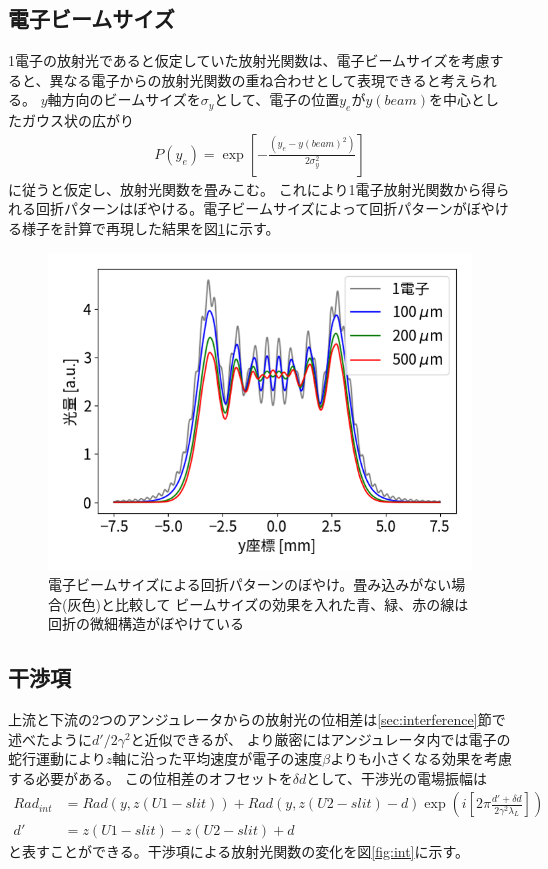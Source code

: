 \documentclass[a4paper,11pt,uplatex]{jsbook}
\begin{document}
\subsection{電子ビームサイズ}
1電子の放射光であると仮定していた放射光関数は、電子ビームサイズを考慮すると、異なる電子からの放射光関数の重ね合わせとして表現できると考えられる。
$y$軸方向のビームサイズを$\sigma_y$として、電子の位置$y_e$が$y(beam)$を中心としたガウス状の広がり
\begin{align}
  P(y_e) = \exp \left[ -\frac{(y_e - y(beam)^2)}{2\sigma_y^2} \right]
\end{align}
に従うと仮定し、放射光関数を畳みこむ。
これにより1電子放射光関数から得られる回折パターンはぼやける。電子ビームサイズによって回折パターンがぼやける様子を計算で再現した結果を図\ref{beamsize}に示す。
\begin{figure}[H]
  \centering
  \includegraphics[width=0.8\linewidth]{image/4-esize.png}
  \caption[放射光関数の電子ビームサイズの効果]{電子ビームサイズによる回折パターンのぼやけ。畳み込みがない場合(灰色)と比較して
  ビームサイズの効果を入れた青、緑、赤の線は回折の微細構造がぼやけている}\label{beamsize}
\end{figure}

\subsection{干渉項}
上流と下流の2つのアンジュレータからの放射光の位相差は\ref{sec:interference}節で述べたように$d'/2\gamma^2$と近似できるが、
より厳密にはアンジュレータ内では電子の蛇行運動により$z$軸に沿った平均速度が電子の速度$\beta$よりも小さくなる効果を考慮する必要がある。
この位相差のオフセットを$\delta d$として、干渉光の電場振幅は
\begin{align}
  Rad_{int} &= Rad(y, z(U1-slit)) + Rad(y, z(U2-slit) -d )\exp(i \left[2\pi \frac{d' + \delta d}{2\gamma^2\lambda_L}\right])\\
  d' &= z(U1-slit) - z(U2-slit) + d
\end{align}
と表すことができる。干渉項による放射光関数の変化を図\ref{fig:int}に示す。
\end{document}
